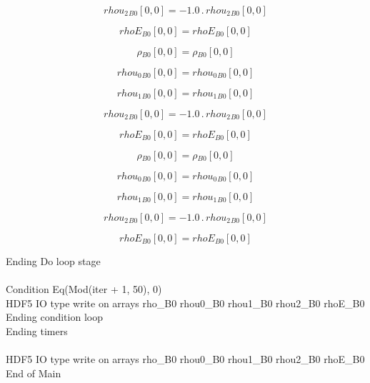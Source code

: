 \documentclass{article}
\begin{document}
\begin{dmath}{rhou_{2}{_{B0}}}[{0,0}] = - 1.0 \,.\, {rhou_{2}{_{B0}}}[{0,0}]\end{dmath}

\begin{dmath}{rhoE{_{B0}}}[{0,0}] = {rhoE{_{B0}}}[{0,0}]\end{dmath}

\begin{dmath}{\rho{_{B0}}}[{0,0}] = {\rho{_{B0}}}[{0,0}]\end{dmath}

\begin{dmath}{rhou_{0}{_{B0}}}[{0,0}] = {rhou_{0}{_{B0}}}[{0,0}]\end{dmath}

\begin{dmath}{rhou_{1}{_{B0}}}[{0,0}] = {rhou_{1}{_{B0}}}[{0,0}]\end{dmath}

\begin{dmath}{rhou_{2}{_{B0}}}[{0,0}] = - 1.0 \,.\, {rhou_{2}{_{B0}}}[{0,0}]\end{dmath}

\begin{dmath}{rhoE{_{B0}}}[{0,0}] = {rhoE{_{B0}}}[{0,0}]\end{dmath}

\begin{dmath}{\rho{_{B0}}}[{0,0}] = {\rho{_{B0}}}[{0,0}]\end{dmath}

\begin{dmath}{rhou_{0}{_{B0}}}[{0,0}] = {rhou_{0}{_{B0}}}[{0,0}]\end{dmath}

\begin{dmath}{rhou_{1}{_{B0}}}[{0,0}] = {rhou_{1}{_{B0}}}[{0,0}]\end{dmath}

\begin{dmath}{rhou_{2}{_{B0}}}[{0,0}] = - 1.0 \,.\, {rhou_{2}{_{B0}}}[{0,0}]\end{dmath}

\begin{dmath}{rhoE{_{B0}}}[{0,0}] = {rhoE{_{B0}}}[{0,0}]\end{dmath}

\noindent Ending Do loop stage\\
\\\noindent Condition Eq(Mod(iter + 1, 50), 0)\\\noindent HDF5 IO type write on arrays rho_B0 rhou0_B0 rhou1_B0 rhou2_B0 rhoE_B0\\\noindent Ending condition loop %
\\\noindent Ending timers\\
\\\noindent HDF5 IO type write on arrays rho_B0 rhou0_B0 rhou1_B0 rhou2_B0 rhoE_B0\\\noindent End of Main\\
\end{document}
